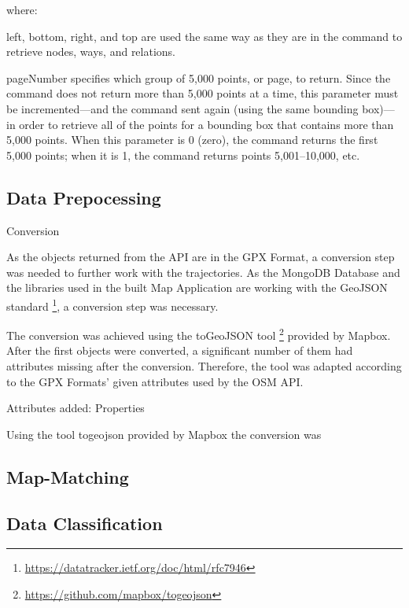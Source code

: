 where:

left, bottom, right, and top are used the same way as they are in the command to retrieve nodes, ways, and relations.

pageNumber specifies which group of 5,000 points, or page, to return. Since the command does not return more than 5,000 points at a time, this parameter must be incremented—and the command sent again (using the same bounding box)—in order to retrieve all of the points for a bounding box that contains more than 5,000 points. When this parameter is 0 (zero), the command returns the first 5,000 points; when it is 1, the command returns points 5,001–10,000, etc.


\subsection{Data Prepocessing}

Conversion

As the objects returned from the API are in the GPX Format, a conversion step was needed to further work with the trajectories. As the MongoDB Database and the libraries used in the built Map Application are working with the GeoJSON standard \footnote{\url{https://datatracker.ietf.org/doc/html/rfc7946}}, a conversion step was necessary.

The conversion was achieved using the toGeoJSON tool \footnote{\url{https://github.com/mapbox/togeojson}} provided by Mapbox. After the first objects were converted, a significant number of them had attributes missing after the conversion.  Therefore, the tool was adapted according to the GPX Formats' given attributes used by the OSM API.  

Attributes added: Properties

Using the tool togeojson provided by Mapbox the conversion was 


\subsection{Map-Matching}



\subsection{Data Classification}


